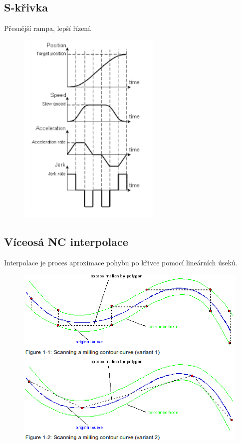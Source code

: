 \subsection{S-křivka}
Přesnější rampa, lepší řízení. \\
\begin{figure}[h!]
    \centering
    \includegraphics[scale = 0.5]{img/Skrivka.png}
\end{figure}
\subsection{Víceosá NC interpolace}
Interpolace je proces aproximace pohybu po křivce pomocí lineárních úseků.\\
\begin{figure}
    \centering
    \includegraphics[scale = 0.3]{img/Interolation.png}
\end{figure}

